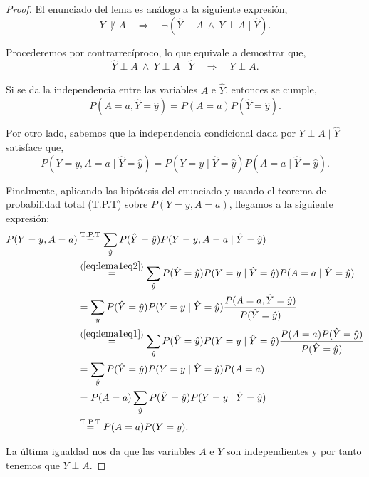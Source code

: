 \documentclass[oneside,openright,titlepage,numbers=noenddot,openany,headinclude,footinclude=true,
cleardoublepage=empty,abstractoff,BCOR=5mm,paper=a4,fontsize=12pt,main=spanish]{scrreprt}
\begin{document}
\begin{proof}
El enunciado del lema es análogo a la siguiente expresión,
\begin{equation*}
Y \not \perp A \quad \Longrightarrow \quad \neg(\hat{Y} \perp A \ \wedge \ Y \perp A \mid \hat{Y}).
\end{equation*}

Procederemos por contrarrecíproco, lo que equivale a demostrar que,
\begin{equation*}
\hat{Y} \perp A \ \wedge \ Y \perp A \mid \hat{Y} \quad \Longrightarrow \quad Y \perp A.
\end{equation*}

Si se da la independencia entre las variables $A$ e $\hat{Y}$, entonces se cumple,
\begin{equation}\label{eq:lema1eq1}
P(A=a,\hat{Y}=\hat{y})=P(A=a)P(\hat{Y}=\hat{y}).
\end{equation}

Por otro lado, sabemos que la independencia condicional dada por $Y \perp A \mid \hat{Y}$ satisface que,
\begin{equation}\label{eq:lema1eq2}
P(Y=y, A=a \mid \hat{Y}=\hat{y})=P(Y=y\mid \hat{Y}=\hat{y})P(A=a\mid \hat{Y}=\hat{y}).
\end{equation}

Finalmente, aplicando las hipótesis del enunciado y usando el teorema de probabilidad total (T.P.T) sobre $P(Y=y,A=a)$, llegamos a la siguiente expresión:
\begin{equation*}
\begin{split}
P(Y=y,A=a)&\overset{\text{T.P.T}}{=}\sum_{\hat{y}} P(\hat{Y}=\hat{y})P(Y=y,A=a \mid \hat{Y}=\hat{y})\\
&\overset{(\ref{eq:lema1eq2})}{=} \sum_{\hat{y}} P(\hat{Y}=\hat{y})P(Y=y\mid \hat{Y}=\hat{y})P(A=a \mid \hat{Y}=\hat{y})\\
&= \sum_{\hat{y}} P(\hat{Y}=\hat{y})P(Y=y\mid \hat{Y}=\hat{y})\frac{\displaystyle P(A=a,\hat{Y}=\hat{y})}{\displaystyle P(\hat{Y}=\hat{y})}\\
&\overset{(\ref{eq:lema1eq1})}{=} \sum_{\hat{y}} P(\hat{Y}=\hat{y})P(Y=y\mid \hat{Y}=\hat{y})\frac{\displaystyle P(A=a)P(\hat{Y}=\hat{y})}{\displaystyle P(\hat{Y}=\hat{y})}\\
&=\sum_{\hat{y}} P(\hat{Y}=\hat{y})P(Y=y\mid \hat{Y}=\hat{y})P(A=a)\\
&=P(A=a)\sum_{\hat{y}} P(\hat{Y}=\hat{y})P(Y=y\mid \hat{Y}=\hat{y})\\
&\overset{\text{T.P.T}}{=}P(A=a)P(Y=y).
\end{split}
\end{equation*}

La última igualdad nos da que las variables $A$ e $Y$ son independientes y por tanto tenemos que $Y\perp A$.
\end{proof}
\end{document}
